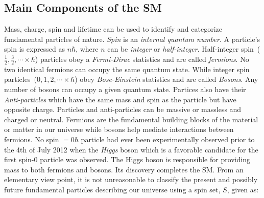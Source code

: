\subsection{Main Components of the SM}
Mass, charge, spin and lifetime can be used to identify and categorize fundamental particles of nature. \textit{Spin} is an \textit{internal quantum number}. A particle's spin is expressed as $n\hbar$, where $n$ can be \textit{integer} or \textit{half-integer}.
Half-integer spin~($\frac{1}{2},\frac{3}{2},\cdots \times\hbar$) particles obey a \textit{Fermi-Dirac} statistics and are called \textit{fermions}. No two identical fermions can occupy the same quantum state. While integer spin particles~($0,1,2,\cdots\times \hbar$) obey \textit{Bose-Einstein} statistics and are called \textit{Bosons}. Any number of bosons can occupy a given quantum state.
Partices also have their \textit{Anti-particles} which have the same mass and spin as the particle but have opposite charge. Particles and anti-particles can be massive or massless and charged or neutral. 
Fermions are the fundamental building blocks of the material or matter in our universe while bosons help mediate interactions between fermions. No spin $=0\hbar$ particle had ever been experimentally observed prior to the 4th of July 2012 when the \textit{Higgs} boson which is a favorable candidate for the first spin-$0$ particle was observed\cite{HIGGSD}. The Higgs boson is responsible for providing mass to both fermions and bosons. Its discovery completes the SM. From an elementary view point, it is not unreasonable to classify the present and possibly future fundamental particles describing our universe using a spin set, $S$, given as:

